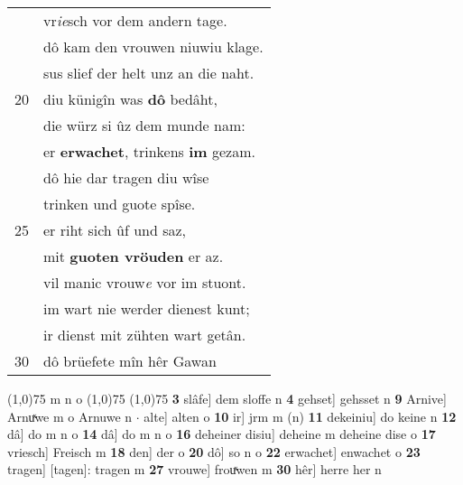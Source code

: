 \documentclass[8pt,a4paper,notitlepage]{article}
\begin{document}
\begin{table}[ht]
\begin{minipage}[t]{0.5\linewidth}
\begin{tabular}{rl}
 & vr\textit{ie}sch vor dem andern tage.\\ 
 & dô kam den vrouwen niuwiu klage.\\ 
 & sus slief der helt unz an die naht.\\ 
20 & diu künigîn was \textbf{dô} bedâht,\\ 
 & die würz si ûz dem munde nam:\\ 
 & er \textbf{erwachet}, trinkens \textbf{im} gezam.\\ 
 & dô hie dar tragen diu wîse\\ 
 & trinken und guote spîse.\\ 
25 & er riht sich ûf und saz,\\ 
 & mit \textbf{guoten vröuden} er az.\\ 
 & vil manic vrouw\textit{e} vor im stuont.\\ 
 & im wart nie werder dienest kunt;\\ 
 & ir dienst mit zühten wart getân.\\ 
30 & dô brüefete mîn hêr Gawan\\ 
\end{tabular}
\scriptsize
\line(1,0){75} \newline
m n o \newline
\line(1,0){75} \newline
\newline
\line(1,0){75} \newline
\textbf{3} slâfe] dem sloffe n \textbf{4} gehset] gehsset n \textbf{9} Arnive] Arnuͯwe m o Arnuwe n  $\cdot$ alte] alten o \textbf{10} ir] jrm m (n) \textbf{11} dekeiniu] do keine n \textbf{12} dâ] do m n o \textbf{14} dâ] do m n o \textbf{16} deheiner disiu] deheine m deheine dise o \textbf{17} vriesch] Freisch m \textbf{18} den] der o \textbf{20} dô] so n o \textbf{22} erwachet] enwachet o \textbf{23} tragen] [tagen]: tragen m \textbf{27} vrouwe] frouͯwen m \textbf{30} hêr] herre her n \newline
\end{minipage}
\end{table}
\newpage
\end{document}
